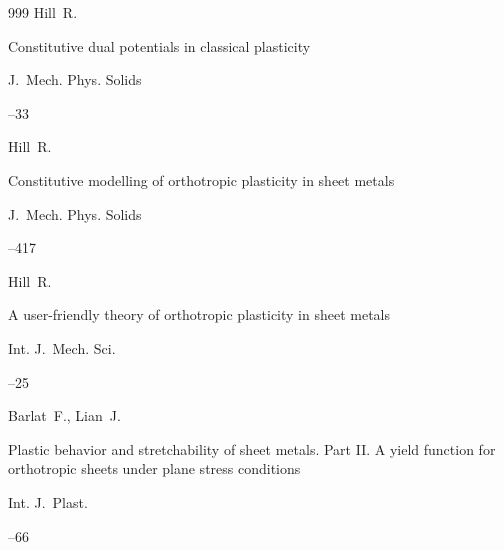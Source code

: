 \begin{thebibliography}{999}
\by Hill~R. 

\paper Constitutive dual potentials in classical plasticity

\jour  J.~Mech. Phys. Solids 




–33






\by Hill~R. 

\paper Constitutive modelling of orthotropic plasticity in sheet metals

\jour  J.~Mech. Phys. Solids 




–417






\by Hill~R. 

\paper A user-friendly theory of orthotropic plasticity in sheet metals

\jour  Int. J.~Mech. Sci.




–25






\by Barlat~F., Lian~J.

\paper Plastic behavior and stretchability of sheet metals. Part II. A yield function for orthotropic sheets under plane stress conditions

\jour Int. J.~Plast.




--66



\end{thebibliography}
